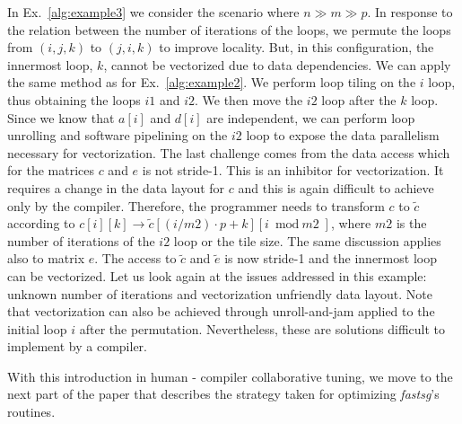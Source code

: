 In Ex.~\ref{alg:example3} we consider the scenario where $n \gg m \gg p$. In response to the relation between the number of iterations of the loops, we permute the loops from $(i,j,k)$ to $(j,i,k)$ to improve locality. But, in this configuration, the innermost loop, $k$, cannot be vectorized due to data dependencies. We can apply the same method as for Ex.~\ref{alg:example2}. We perform loop tiling on the $i$ loop, thus obtaining the loops $\textit{i1}$ and $\textit{i2}$. We then move the $\textit{i2}$ loop after the $k$ loop. Since we know that $a[i]$ and $d[i]$ are independent, we can perform loop unrolling and software pipelining on the $\textit{i2}$ loop to expose the data parallelism necessary for vectorization. The last challenge comes from the data access which for the matrices $c$ and $e$ is not stride-1. This is an inhibitor for vectorization. It requires a change in the data layout for $c$ and this is again difficult to achieve only by the compiler. Therefore, the programmer needs to transform $c$ to $\tilde{c}$ according to $c[i][k] \rightarrow \tilde{c}[(i/\textit{m2}) \cdot p + k][i \bmod \textit{m2}]$, where $\textit{m2}$ is the number of iterations of the $\textit{i2}$ loop or the tile size. The same discussion applies also to matrix $e$. The access to $\tilde{c}$ and $\tilde{e}$ is now stride-1 and the innermost loop can be vectorized. Let us look again at the issues addressed in this example: unknown number of iterations and vectorization unfriendly data layout. Note that vectorization can also be achieved through unroll-and-jam applied to the initial loop $i$ after the permutation. Nevertheless, these are solutions difficult to implement by a compiler.

With this introduction in human - compiler collaborative tuning, we move to the next part of the paper that describes the strategy taken for optimizing \textit{fastsg}'s routines. 
